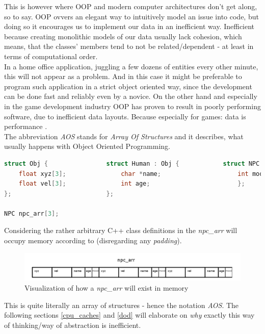  This is however where OOP and modern computer architectures don't get along, so to say. OOP ovvers an elegant way to intuitively model an issue into code, but doing so it encourages us to implement our data in an inefficient way. Inefficient because creating monolithic models of our data usually lack cohesion, which means, that the classes' members tend to not be related/dependent  - at least in terms of computational order.\\
 In a home office application, juggling a few dozens of entities every other minute, this will not appear as a problem. And in this case it might be preferable to program such application in a strict object oriented way, since the development can be done fast and reliably even by a novice. On the other hand and especially in the game development industry OOP has proven to result in poorly performing software, due to inefficient data layouts. Because especially for games: data is performance .\\
 The abbreviation \textit{AOS} stands for \textit{Array Of Structures} and it describes, what usually happens with Object Oriented Programming.\\
 \begin{lstlisting}[language=C++,numbers=none,name={Example of some hierarchical POD class definitions},label={pods}]
struct Obj {				struct Human : Obj {			struct NPC : Human {
	float xyz[3];				char *name;						int mood;
	float vel[3];				int age;						};
};							};

NPC npc_arr[3];
 \end{lstlisting}
Considering the rather arbitrary C++ class definitions in  the \textit{npc\_arr} will occupy memory according to  (disregarding any \textit{padding}).
\begin{figure}[!htbp]
	\centering
	\includegraphics[width=1.0\linewidth]{PICs/npcs_in_memory}
	\caption{Visualization of how a \textit{npc\_arr} will exist in memory}\label{npcs_in_memory}
\end{figure}
This is quite literally an array of structures - hence the notation \textit{AOS}. The following sections \ref{cpu_caches} and \ref{dod} will elaborate on \textit{why} exactly this way of thinking/way of abstraction is inefficient.




